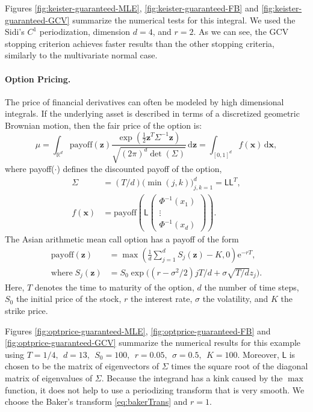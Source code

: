 \documentclass[twocolumn]{svjour3}          %
\newcommand{\bm}[1]{\boldsymbol{#1}}
\newcommand{\mSigma}{\mathsf{\Sigma}}
\newcommand{\dif}[1]{\text{d}{#1}}
\newcommand{\reals}{\mathbb{R}}
\newcommand{\vx}{\bm{x}}
\newcommand{\dvx}{\dif{\bm{x}}}
\newcommand{\vz}{\bm{z}}
\newcommand{\dvz}{\dif{\bm{z}}}
\newcommand{\mL}{\mathsf{L}}
\newcommand{\me}{\mathrm{e}}
\begin{document}
Figures \ref{fig:keister-guaranteed-MLE}, \ref{fig:keister-guaranteed-FB} and \ref{fig:keister-guaranteed-GCV} summarize the numerical tests for this integral.  We used the Sidi's $C^1$ periodization, dimension $d=4$, and $r=2$. 
As we can see, the GCV stopping criterion achieves faster results than the other stopping criteria, similarly to the multivariate normal case.

\paragraph{Option Pricing.}

The price of financial derivatives can often be modeled by high dimensional integrals. If the underlying asset is described in terms of a discretized geometric Brownian motion, then the fair price of the option is:
\begin{equation*}
\mu = \int_{\reals^d} \text{payoff}(\vz) \frac{\exp(\frac 12 \vz^T\mSigma^{-1}\vz)}{\sqrt{(2\pi)^d \det(\mSigma)}} \, \dvz = \int_{[0,1]^d} f(\vx) \, \dvx,
\end{equation*} 
where {payoff($\cdot$)} defines the discounted payoff of the option,
\begin{align*}
\mSigma &= (T/d) \bigl(\min(j,k) \bigr)_{j,k=1}^d = \mL \mL^T,\\
f(\vx) &= \text{payoff} \left(\mL 
\begin{pmatrix}
\Phi^{-1}(x_1) \\ \vdots \\ \Phi^{-1}(x_d)
\end{pmatrix} \right).
\end{align*}
The Asian arithmetic mean call option has a payoff of the form
\begin{align*}
\text{payoff}(\vz) &= \max\left( \frac 1d  \sum_{j=1}^d S_j(\vz) - K, 0 \right) \me^{-r T}, \\
\text{where}\;
S_j(\vz) &= S_0 \exp\bigl((r-\sigma^2/2)jT/d + \sigma \sqrt{T/d} z_j \bigr).
\end{align*}
Here, $T$ denotes the time to maturity of the option, $d$ the number of time steps, $S_0$ the initial price of the stock, $r$ the interest rate, $\sigma$ the volatility, and $K$ the strike price.  

Figures \ref{fig:optprice-guaranteed-MLE}, \ref{fig:optprice-guaranteed-FB} and 
\ref{fig:optprice-guaranteed-GCV} summarize the numerical results for this example using
$
T = 1/4, \ \ d = 13, \ \ S_0 = 100, \ \ r =  0.05, \ \ \sigma = 0.5, \ \ K = 100.
$
Moreover, $\mL$ is chosen to be the matrix of eigenvectors of $\mSigma$ times the square root of the diagonal matrix of eigenvalues of $\mSigma$.
Because the integrand has a kink caused by the $\max$ function, it does not help to use a periodizing transform that is very smooth.  We choose the Baker's transform \eqref{eq:bakerTrans} and $r = 1$.
\end{document}
